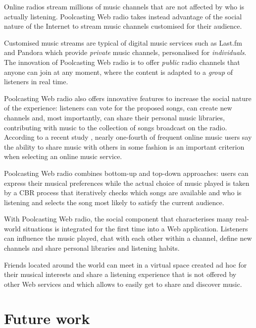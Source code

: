 Online radios stream millions of music channels that are not affected by who is actually listening. 
Poolcasting Web radio takes instead advantage of the social nature of the Internet to stream music channels customised for their audience.

Customised music streams are typical of digital music services such as Last.fm and Pandora which provide \emph{private} music channels, personalised for \emph{individuals}.
The innovation of Poolcasting Web radio is to offer %
\emph{public} radio channels that anyone can join at any moment, where the content is adapted to a \emph{group} of listeners in real time.

Poolcasting Web radio also offers innovative features to increase the social nature of the experience: listeners can vote for the proposed songs, can create new channels and, most importantly, can share their personal music libraries, contributing with music to the collection of songs broadcast on the radio.
%
According to a recent study \cite{McGuire05}, nearly one-fourth of frequent online music users say the ability to share music with others in some fashion is an important criterion when selecting an online music service.

Poolcasting Web radio combines bottom-up and top-down approaches: users can express their musical preferences while the actual choice of music played is taken by a CBR process that iteratively checks which songs are available and who is listening and selects the song most likely to satisfy the current audience.

With Poolcasting Web radio, the social component that characterises many real-world situations is integrated for the first time into a Web application.
Listeners can influence the music played, chat with each other within a channel, define new channels and share personal libraries and listening habits.

Friends located around the world can meet in a virtual space created ad hoc for their musical interests and share a listening experience that is not offered by other Web services and which allows to easily get to share and discover music.



\section{Future work} %



